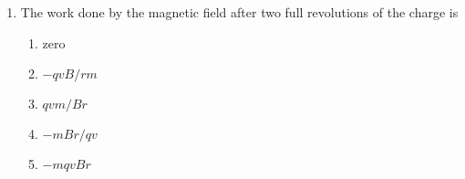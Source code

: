 \documentclass{../../../oss-apphys}
\begin{document}
\begin{multicols}{2}
\begin{enumerate}[leftmargin=18pt,resume]
  \item The work done by the magnetic field after two full revolutions of the
    charge is
    \begin{enumerate}[noitemsep,topsep=0pt,leftmargin=18pt,label=(\Alph*)]
    \item zero
    \item $-qvB/rm$
    \item $qvm/Br$
    \item $-mBr/qv$
    \item $-mqvBr$
    \end{enumerate}

    
  \end{enumerate}
\end{multicols}

\newpage
%  
\end{document}
